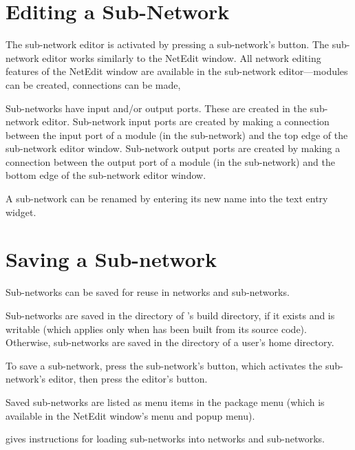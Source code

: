 \section{Editing a Sub-Network}
\label{sec:editsubnet}

The sub-network editor is activated by pressing a sub-network's
 button.  The sub-network editor works similarly
to the NetEdit window.  All network editing features of the NetEdit
window are available in the sub-network editor---modules can be
created, connections can be made, \etc{}

Sub-networks have input and/or output ports.  These are created in the
sub-network editor.  Sub-network input ports are created by making a
connection between the input port of a module (in the sub-network) and
the top edge of the sub-network editor window.  Sub-network output
ports are created by making a connection between the output port of a
module (in the sub-network) and the bottom edge of the sub-network
editor window.

A sub-network can be renamed by entering its new name into the
 text entry widget.

\section{Saving a Sub-network}
\label{sec:savesubnet}

Sub-networks can be saved for reuse in networks and sub-networks.

Sub-networks are saved in the  directory of \sr{}'s
build directory, if it exists and is writable (which applies only when
\sr{} has been built from its source code).  Otherwise, sub-networks
are saved in the  directory of a user's home
directory.

To save a sub-network, press the sub-network's 
button, which activates the sub-network's editor, then press the
editor's  button.

Saved sub-networks are listed as menu items in the 
package menu (which is available in the NetEdit window's 
menu and popup menu).

 gives instructions for
loading sub-networks into networks and sub-networks.

